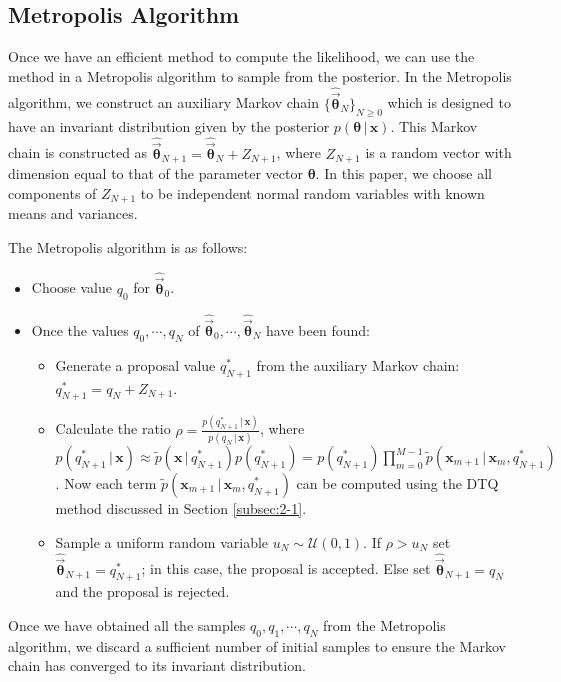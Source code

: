\documentclass[graybox]{svmult}
\newcommand{\btheta}{\ensuremath{\boldsymbol{\theta}}}
\begin{document}
\subsection{Metropolis Algorithm}
\label{subsec:2-2}
Once we have an efficient method to compute the likelihood, we can use the method in a Metropolis algorithm to sample from the posterior. In the Metropolis algorithm, we construct an auxiliary  Markov chain $\lbrace \hat{\vec{\btheta}}_N\rbrace_{N\geq 0}$ which is designed to have an invariant distribution given by the posterior $p(\btheta \, | \, \mathbf{x})$. This Markov chain is constructed as $\hat{\vec{\btheta}}_{N+1} = \hat{\vec{\btheta}}_N + Z_{N+1}$,
where $Z_{N+1}$ is a random vector with dimension equal to that of the parameter vector $\btheta$.  In this paper, we choose all components of $Z_{N+1}$ to be independent normal random variables with known means and variances.

The Metropolis algorithm is as follows:
\begin{itemize}
\item Choose value $q_0$ for $\hat{\vec{\btheta}}_{0}$.
\item Once the values $q_0, \cdots, q_N$ of $\hat{\vec{\btheta}}_{0},\cdots,\hat{\vec{\btheta}}_{N}$ have been found:
\begin{itemize}
\item Generate a proposal value $q_{N+1}^{*}$ from the auxiliary Markov chain:
$q_{N+1}^{*} = q_{N} + Z_{N+1}$.
\item Calculate the ratio $\rho = \frac{p(q_{N+1}^{*}  \, | \, \mathbf{x})}{p(q_N \, | \, \mathbf{x})}$, where $p(q_{N+1}^{*}  \, | \, \mathbf{x}) \approx \widetilde{p}(\mathbf{x} \, | \, q_{N+1}^{*}) p(q_{N+1}^{*}) = p(q_{N+1}^{*}) \prod_{m=0}^{M-1} \widetilde{p}(\mathbf{x}_{m+1} \, | \, \mathbf{x}_m, q_{N+1}^{*})$. Now each term $\widetilde{p}(\mathbf{x}_{m+1} \, | \, \mathbf{x}_m, q_{N+1}^{*})$ can be computed using the DTQ method
discussed in Section \ref{subsec:2-1}.
\item Sample a uniform random variable $u_N \sim \mathcal{U}(0,1)$.  If $\rho > u_N$ set $\hat{\vec{\btheta}}_{N+1} = q_{N+1}^{*}$; in this case, the proposal is accepted. Else set $\hat{\vec{\btheta}}_{N+1} = q_{N}$ and the proposal is rejected.
\end{itemize}
\end{itemize}
Once we have obtained all the samples $q_0, q_1, \cdots, q_N$ from the Metropolis algorithm, we discard a sufficient number of initial samples to ensure the Markov chain has converged to its invariant distribution.
\end{document}
